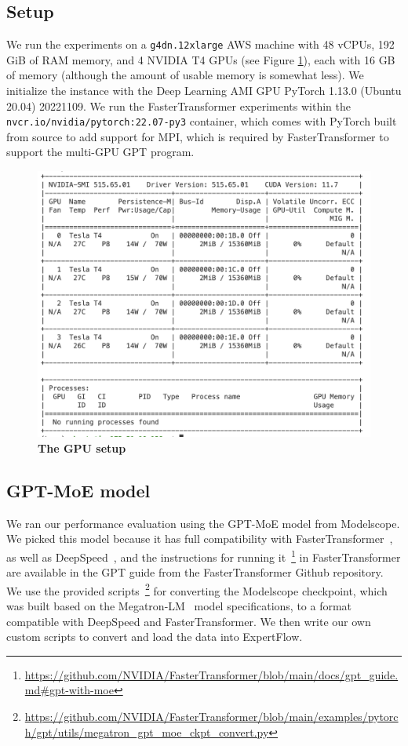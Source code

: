 \subsection{Setup}
We run the experiments on a \texttt{g4dn.12xlarge} AWS machine with 48 vCPUs, 192 GiB of RAM memory, and 4 NVIDIA T4 GPUs (see Figure \ref{fig:gpu-setup}), each with 16 GB of memory (although the amount of usable memory is somewhat less). We initialize the instance with the Deep Learning AMI GPU PyTorch 1.13.0 (Ubuntu 20.04) 20221109. We run the FasterTransformer experiments within the \texttt{nvcr.io/nvidia/pytorch:22.07-py3} container, which comes with PyTorch built from source to add support for MPI, which is required by FasterTransformer to support the multi-GPU GPT program.

\begin{figure}[H]
    \centering
    \includegraphics[width=\linewidth]{figures/nvidia-smi.png}
    \caption{\textbf{The GPU setup}}
    \label{fig:gpu-setup}
\end{figure}

\subsection{GPT-MoE model}
We ran our performance evaluation using the GPT-MoE model from Modelscope. We picked this model because it has full compatibility with FasterTransformer~\cite{faster_transformer}, as well as DeepSpeed~\cite{deepspeed-moe}, and the instructions for running it~\footnote{\url{https://github.com/NVIDIA/FasterTransformer/blob/main/docs/gpt\_guide.md\#gpt-with-moe}} in FasterTransformer are available in the GPT guide from the FasterTransformer Github repository. We use the provided scripts~\footnote{\url{https://github.com/NVIDIA/FasterTransformer/blob/main/examples/pytorch/gpt/utils/megatron\_gpt\_moe\_ckpt\_convert.py}} for converting the Modelscope checkpoint, which was built based on the Megatron-LM~\cite{megatron-lm} model specifications, to a format compatible with DeepSpeed and FasterTransformer. We then write our own custom scripts to convert and load the data into ExpertFlow.

